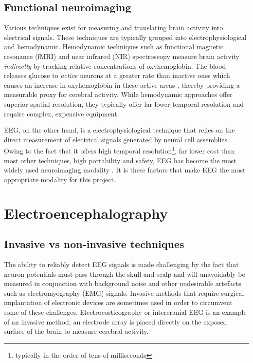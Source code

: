 \subsection{Functional neuroimaging}
Various techniques exist for measuring and translating brain activity into electrical signals. These techniques are typically grouped into electrophysiological and hemodynamic. Hemodynamic techniques such as functional magnetic resonance (fMRI) and near infrared (NIR) spectroscopy measure brain activity \textit{indirectly }by tracking relative concentrations of oxyhemoglobin. The blood releases glucose to \textit{active} neurons at a greater rate than inactive ones which causes an increase in oxyhemoglobin in these active areas \cite{bci-survey-nicolas-alonso}, thereby providing a measurable proxy for cerebral activity. While hemodynamic approaches offer superior spatial resolution, they typically offer far lower temporal resolution and require complex, expensive equipment. 

EEG, on the other hand, is a electrophysiological technique that relies on the direct measurement of electrical signals generated by neural cell assemblies. Owing to the fact that it offers high temporal resolution\footnote{typically in the order of tens of milliseconds}, far lower cost than most other techniques, high portability and safety, EEG has become the most widely used neuroimaging modality \cite{bci-survey-nicolas-alonso}. It is these factors that make EEG the most appropriate modality for this project.

\section{Electroencephalography}

\subsection{Invasive vs non-invasive techniques}

The ability to reliably detect EEG signals is made challenging by the fact that neuron potentials must pass through the skull and scalp and will unavoidably be measured in conjunction with background noise and other undesirable artefacts such as electromyography (EMG) signals. Invasive methods that require surgical implantation of electronic devices are sometimes used in order to circumvent some of these challenges. Electrocorticography or intercranial EEG is an example of an invasive method; an electrode array is placed directly on the exposed surface of the brain to measure cerebral activity. 

